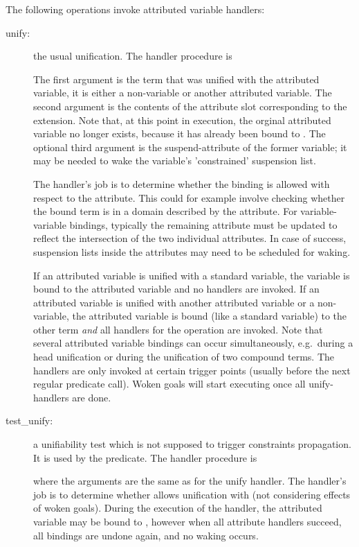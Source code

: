 The following operations invoke attributed variable handlers:

\begin{description}
\item [unify:]
  the usual unification.
The handler procedure is
\begin{quote}
\end{quote}
The first argument is the term that was unified with the attributed variable,
it is either a non-variable or another attributed variable.
The second argument is the contents of the attribute slot
corresponding to the extension.  Note that, at this point in execution,
the orginal attributed variable no longer exists, because it has already
been bound to .
The optional third argument is the suspend-attribute of the former
variable; it may be needed to wake the variable's 'constrained' suspension
list.

The handler's job is to determine whether the binding is allowed with
respect to the attribute.  This could for example involve checking whether
the bound term is in a domain described by the attribute.
For variable-variable bindings, typically the remaining attribute must
be updated to reflect the intersection of the two individual attributes.
In case of success, suspension lists inside the attributes may need to
be scheduled for waking.

If an attributed variable is unified with a standard variable, the variable is
bound
to the attributed variable and no handlers are invoked.
If an attributed variable is unified with another attributed variable or a
non-variable,
the attributed variable is bound (like a standard variable) to the other term
\emph{and} all handlers for the  operation are invoked.
Note that several attributed variable bindings can occur simultaneously,
e.g.\ during a head unification or
during the unification of two compound terms.
The handlers are only invoked at certain trigger points (usually before the
next regular predicate call).  Woken goals will start executing once all
unify-handlers are done.

\item [test_unify:]
  a unifiability test which is not supposed
to trigger constraints propagation. It is used
by the 
predicate.
The handler procedure is
\begin{quote}
\end{quote}
where the arguments are the same as for the unify handler.
The handler's job is to determine whether  allows
unification with  (not considering effects of woken goals).
During the execution of the handler, the attributed variable may be bound
to , however when all attribute handlers succeed,
all bindings are undone again, and no waking occurs.


\end{description}
